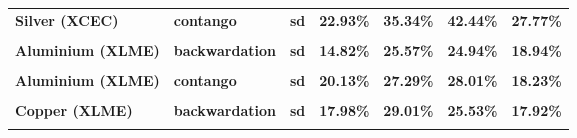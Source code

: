 \documentclass[
  authoryear,
  preprint,
  3p]{elsarticle}
\begin{document}
\begin{longtable}[t]{>{}l>{}l>{}l>{}r>{}r>{}r>{}r}
\addlinespace
\textbf{Silver (XCEC)} & \textbf{contango} & \textbf{sd} & \textcolor[HTML]{4285f4}{\textbf{22.93\%}} & \textcolor[HTML]{4285f4}{\textbf{35.34\%}} & \textcolor[HTML]{4285f4}{\textbf{42.44\%}} & \textcolor[HTML]{4285f4}{\textbf{27.77\%}}\\
\textbf{\cellcolor{gray!10}{Aluminium (XLME)}} & \textbf{\cellcolor{gray!10}{backwardation}} & \textbf{\cellcolor{gray!10}{mean}} & \textcolor[HTML]{4285f4}{\textbf{\cellcolor{gray!10}{2.56\%}}} & \textcolor[HTML]{4285f4}{\textbf{\cellcolor{gray!10}{14.78\%}}} & \textcolor[HTML]{4285f4}{\textbf{\cellcolor{gray!10}{16.25\%}}} & \textcolor[HTML]{4285f4}{\textbf{\cellcolor{gray!10}{**23.68\%}}}\\
\textbf{Aluminium (XLME)} & \textbf{backwardation} & \textbf{sd} & \textcolor[HTML]{4285f4}{\textbf{14.82\%}} & \textcolor[HTML]{4285f4}{\textbf{25.57\%}} & \textcolor[HTML]{4285f4}{\textbf{24.94\%}} & \textcolor[HTML]{4285f4}{\textbf{18.94\%}}\\
\textbf{\cellcolor{gray!10}{Aluminium (XLME)}} & \textbf{\cellcolor{gray!10}{contango}} & \textbf{\cellcolor{gray!10}{mean}} & \textcolor[HTML]{4285f4}{\textbf{\cellcolor{gray!10}{-0.38\%}}} & \textcolor[HTML]{4285f4}{\textbf{\cellcolor{gray!10}{12.86\%}}} & \textcolor[HTML]{4285f4}{\textbf{\cellcolor{gray!10}{-23.04\%}}} & \textcolor[HTML]{4285f4}{\textbf{\cellcolor{gray!10}{-16.74\%}}}\\
\textbf{Aluminium (XLME)} & \textbf{contango} & \textbf{sd} & \textcolor[HTML]{4285f4}{\textbf{20.13\%}} & \textcolor[HTML]{4285f4}{\textbf{27.29\%}} & \textcolor[HTML]{4285f4}{\textbf{28.01\%}} & \textcolor[HTML]{4285f4}{\textbf{18.23\%}}\\
\addlinespace
\textbf{\cellcolor{gray!10}{Copper (XLME)}} & \textbf{\cellcolor{gray!10}{backwardation}} & \textbf{\cellcolor{gray!10}{mean}} & \textcolor[HTML]{4285f4}{\textbf{\cellcolor{gray!10}{1.54\%}}} & \textcolor[HTML]{4285f4}{\textbf{\cellcolor{gray!10}{25.22\%}}} & \textcolor[HTML]{4285f4}{\textbf{\cellcolor{gray!10}{18.66\%}}} & \textcolor[HTML]{4285f4}{\textbf{\cellcolor{gray!10}{11.99\%}}}\\
\textbf{Copper (XLME)} & \textbf{backwardation} & \textbf{sd} & \textcolor[HTML]{4285f4}{\textbf{17.98\%}} & \textcolor[HTML]{4285f4}{\textbf{29.01\%}} & \textcolor[HTML]{4285f4}{\textbf{25.53\%}} & \textcolor[HTML]{4285f4}{\textbf{17.92\%}}\\
\textbf{\cellcolor{gray!10}{Copper (XLME)}} & \textbf{\cellcolor{gray!10}{contango}} & \textbf{\cellcolor{gray!10}{mean}} & \textcolor[HTML]{4285f4}{\textbf{\cellcolor{gray!10}{-0.95\%}}} & \textcolor[HTML]{4285f4}{\textbf{\cellcolor{gray!10}{32\%}}} & \textcolor[HTML]{4285f4}{\textbf{\cellcolor{gray!10}{-6.78\%}}} & \textcolor[HTML]{4285f4}{\textbf{\cellcolor{gray!10}{-11.89\%}}}\\

\end{longtable}
\end{document}
